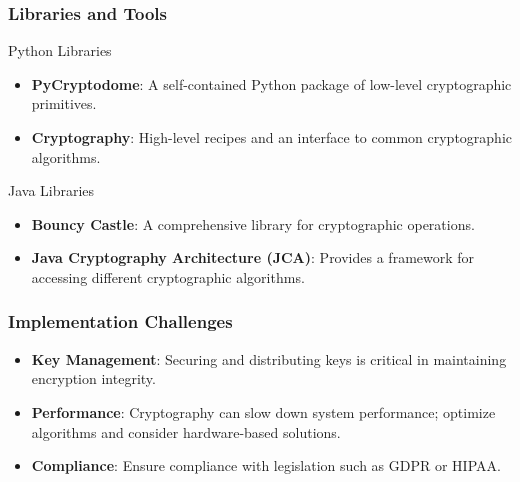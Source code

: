 \documentclass{beamer}
\begin{document}
\begin{frame}[fragile]
    \frametitle{Libraries and Tools}
    \begin{block}{Python Libraries}
        \begin{itemize}
            \item \textbf{PyCryptodome}: A self-contained Python package of low-level cryptographic primitives.
            \item \textbf{Cryptography}: High-level recipes and an interface to common cryptographic algorithms.
        \end{itemize}
    \end{block}
    \begin{block}{Java Libraries}
        \begin{itemize}
            \item \textbf{Bouncy Castle}: A comprehensive library for cryptographic operations.
            \item \textbf{Java Cryptography Architecture (JCA)}: Provides a framework for accessing different cryptographic algorithms.
        \end{itemize}
    \end{block}
\end{frame}

\begin{frame}[fragile]
    \frametitle{Implementation Challenges}
    \begin{itemize}
        \item \textbf{Key Management}: Securing and distributing keys is critical in maintaining encryption integrity.
        \item \textbf{Performance}: Cryptography can slow down system performance; optimize algorithms and consider hardware-based solutions.
        \item \textbf{Compliance}: Ensure compliance with legislation such as GDPR or HIPAA.
    \end{itemize}
\end{frame}
\end{document}

